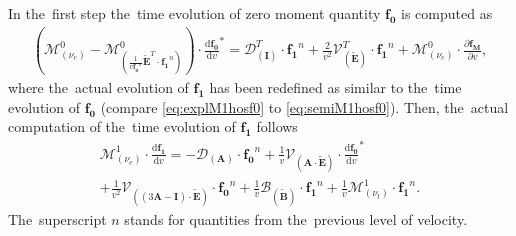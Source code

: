 \documentclass[preprint,12pt]{elsarticle}
\newcommand{\pdv}[2]{\frac{\partial{#1}}{\partial{#2}}}
\newcommand{\vect}[1]{\boldsymbol{#1}}
\newcommand{\matr}[1]{\mathbf{#1}}
\newcommand{\dI}{\text{d}}
\newcommand{\odv}[2]{\frac{\dI #1}{\dI #2}}
\newcommand{\ddv}[2]{\odv{#1}{#2}}
\newcommand{\nue}{\nu_{e}}
\newcommand{\nutot}{\nu_{t}}
\newcommand{\vmag}{v}
\newcommand{\tE}{\vect{\tilde{E}}}
\newcommand{\tB}{\vect{\tilde{B}}}
\newcommand{\fM}{f_M}
\newcommand{\vfzero}{\vect{f_0}}
\newcommand{\fone}{\vect{f_1}}
\newcommand{\MI}{\matr{I}}
\newcommand{\MA}{\matr{A}}
\newcommand{\IM}{\boldsymbol{\mathcal{M}}}
\newcommand{\ID}{\boldsymbol{\mathcal{D}}}
\newcommand{\IV}{\boldsymbol{\mathcal{V}}}
\newcommand{\IB}{\boldsymbol{\mathcal{B}}}
\newcommand{\figref}[1]{FIG.~\ref{#1}}
\begin{document}
In the~first step the~time evolution of zero moment quantity $\vfzero$ is 
computed as
\begin{multline}
  \left( \IM^0_{\left( \nue \right)} 
  - \IM^0_{\left(\frac{1}{\vmag \vfzero^n}\tE^T\cdot\fone^n\right)}
  \right) \cdot {\ddv{\vfzero}{\vmag}}^* 
  = 
  \ID^T_{\left(\MI\right)} \cdot \fone^n 
  + \frac{2}{\vmag^2}\IV^T_{\left(\tE\right)} \cdot \fone^n
  + \IM^0_{\left( \nue \right)} \cdot \pdv{\vect{\fM}}{\vmag} ,  
  \label{eq:explM1hosf0}
\end{multline}
where the~actual evolution of $\fone$ has been redefined as similar to 
the~time evolution of $\vfzero$ (compare \eqref{eq:explM1hosf0} to 
\eqref{eq:semiM1hosf0}). Then, the~actual computation of the~time evolution 
of $\fone$ follows
\begin{multline}
  \IM^1_{\left( \nue \right)} \cdot \ddv{\fone}{\vmag} 
  = 
  - \ID_{\left(\MA\right)}\cdot \vfzero^n  
  + \frac{1}{\vmag}\IV_{\left(\MA \cdot \tE\right)} \cdot
  {\ddv{\vfzero}{\vmag}}^* \\
  + \frac{1}{\vmag^2}\IV_{\left( 
  \left( 3\MA - \MI \right) \cdot \tE \right)} \cdot \vfzero^n
  + \frac{1}{\vmag}\IB_{\left( \tB \right)} \cdot \fone^n
  + \frac{1}{\vmag}\IM^1_{\left( \nutot \right)} 
  \cdot \fone^n .
  \label{eq:explM1hosf1}
\end{multline}
The~superscript $n$ stands for quantities from the~previous level of velocity.


\end{document}
